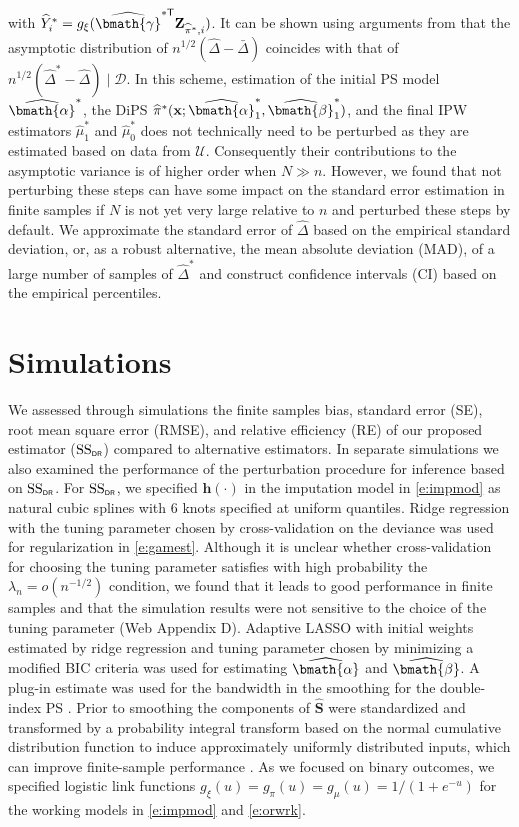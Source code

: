 \documentclass[useAMS,referee,usenatbib]{biom}
\def\bx{\mathbf{x}}
\def\bZ{\mathbf{Z}}
\def\bh{\mathbf{h}}
\def\bShat{\widehat{\mathbf{S}}}
\def\bgamhat{\widehat{\bmath{\gamma}}}
\def\balphhat{\widehat{\bmath{\alpha}}}
\def\bbetahat{\widehat{\bmath{\beta}}}
\def\Delthat{\widehat{\Delta}}
\def\Deltbar{\bar{\Delta}}
\def\muhat{\widehat{\mu}}
\def\pihat{\widehat{\pi}}
\def\Ystrhat{\widehat{Y}^*}
\def\Uscr{\mathscr{U}}
\def\Dscr{\mathscr{D}}
\def\bZpihatstri{\bZ_{\pihat^*,i}}
\def\SSDR{\mbox{SS}_{\sf \scriptscriptstyle DR}}
\def\bZpihatstri{\bZ_{\pihat^*,i}}
\begin{document}
with $\Ystrhat_i = g_{\xi}(\bgamhat^{*\sf \tiny T}\bZpihatstri)$.  
It can be shown using arguments from \cite{jin2001simple} that the asymptotic distribution of $n^{1/2}(\Delthat - \Deltbar)$ coincides with that of $n^{1/2}(\Delthat^* - \Delthat)\mid \Dscr$.  
In this scheme, estimation of the initial PS model $\balphhat^*$, the DiPS $\pihat^*(\bx;\balphhat_1^*,\bbetahat_1^*)$, and the final IPW estimators $\muhat_1^*$ 
and $\muhat_0^*$ does not technically need to be perturbed as they are estimated based on data from $\Uscr$.
Consequently their contributions to the asymptotic variance is of higher order when $N \gg n$. However, we found that not perturbing these steps can have some impact on the standard error estimation in finite samples if $N$ is not yet very large relative to $n$ and perturbed these steps by default. We approximate the standard error of $\Delthat$ based on the empirical standard deviation, or, as a robust alternative, the mean absolute deviation (MAD), of a large number of samples of $\Delthat^*$ and construct confidence intervals (CI) based on the empirical percentiles.
\section{Simulations}
\label{s:sims}

We assessed through simulations the finite samples bias, standard error (SE), root mean square error (RMSE), and relative efficiency (RE) of our proposed estimator ($\SSDR$) compared to alternative estimators.  In separate simulations we also examined the performance of the perturbation procedure for inference based on $\SSDR$.  For $\SSDR$, we specified $\bh(\cdot)$ in the imputation model in \eqref{e:impmod} as natural cubic splines with 6 knots specified at uniform quantiles.  
Ridge regression with the tuning parameter chosen by cross-validation on the deviance was used for regularization in \eqref{e:gamest}.
Although it is unclear whether cross-validation for choosing the tuning parameter satisfies with high probability the 
$\lambda_n = o(n^{-1/2})$ condition, we found that
it leads to good performance in finite samples and that the simulation results were not sensitive to the choice of the tuning parameter (Web Appendix D).
Adaptive LASSO with initial weights estimated by ridge regression and tuning parameter chosen by minimizing a modified BIC criteria \citep{minnier2011perturbation} 
was used for estimating $\balphhat$ and $\bbetahat$.  
A plug-in estimate was used for the bandwidth in the smoothing for the double-index PS \citep{cheng2017estimating}.  Prior to smoothing the components of $\bShat$ were standardized and transformed by a probability integral transform based on the normal cumulative distribution function to induce approximately uniformly distributed inputs, which can improve finite-sample performance \citep{wand1991transformations}.  As we focused on binary outcomes, we specified logistic link functions $g_{\xi}(u)=g_{\pi}(u)=g_{\mu}(u)=1/(1+e^{-u})$ for the working models in \eqref{e:impmod} and \eqref{e:orwrk}.  
\end{document}
